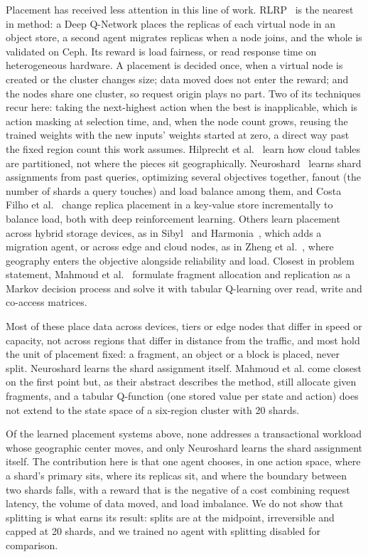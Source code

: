 Placement has received less attention in this line of work. RLRP~\cite{lu2022rlrp} is the nearest
in method: a Deep Q-Network places the replicas of each virtual node in an
object store, a second agent migrates replicas when a node joins, and the whole
is validated on Ceph. Its reward is load fairness, or read response time on heterogeneous hardware. A placement is decided once, when a virtual node is created or
the cluster changes size; data moved does not enter the reward; and the nodes
share one cluster, so request origin plays no part. Two of its techniques recur
here: taking the next-highest action when the best is inapplicable, which is
action masking at selection time, and, when the node count grows, reusing the
trained weights with the new inputs' weights started at zero, a direct way past
the fixed region count this work assumes.
Hilprecht et al.~\cite{hilprecht2020partitioning} learn how cloud tables are
partitioned, not where the pieces sit geographically.
Neuroshard~\cite{eldeeb2022neuroshard} learns shard assignments from past
queries, optimizing several objectives together, fanout (the number of shards a
query touches) and load balance among them, and Costa Filho et
al.~\cite{costafilho2020adaptive} change replica placement in a key-value store
incrementally to balance load, both with deep reinforcement learning.
Others learn placement across hybrid storage devices, as in
Sibyl~\cite{singh2022sibyl} and Harmonia~\cite{nadig2026harmonia}, which adds a
migration agent, or across edge and cloud nodes, as in Zheng et
al.~\cite{zheng2024replica}, where geography enters the objective alongside
reliability and load. Closest in
problem statement, Mahmoud et al.~\cite{mahmoud2025rlfawm} formulate fragment
allocation and replication as a Markov decision process and solve it with
tabular Q-learning over read, write and co-access matrices.

Most of these place data across devices, tiers or edge nodes that differ in
speed or capacity, not across regions that differ in distance from the
traffic, and most hold the unit of placement fixed: a fragment, an object or a
block is placed, never split. Neuroshard learns the shard assignment itself.
Mahmoud et al. come closest on the first point but, as their abstract describes
the method, still allocate given fragments, and a tabular Q-function (one stored
value per state and action) does not extend to the state space of a six-region
cluster with 20 shards.

Of the learned placement systems above, none addresses a transactional
workload whose geographic center moves, and only Neuroshard learns the shard
assignment itself. The contribution here is that one agent chooses, in one
action space, where a shard's primary sits, where its replicas sit, and where
the boundary between two shards falls, with a reward that is the negative of a
cost combining request latency, the volume of data moved, and load imbalance.
We do not show that splitting is what earns its result: splits are at the
midpoint, irreversible and capped at 20 shards, and we trained no agent with
splitting disabled for comparison.

